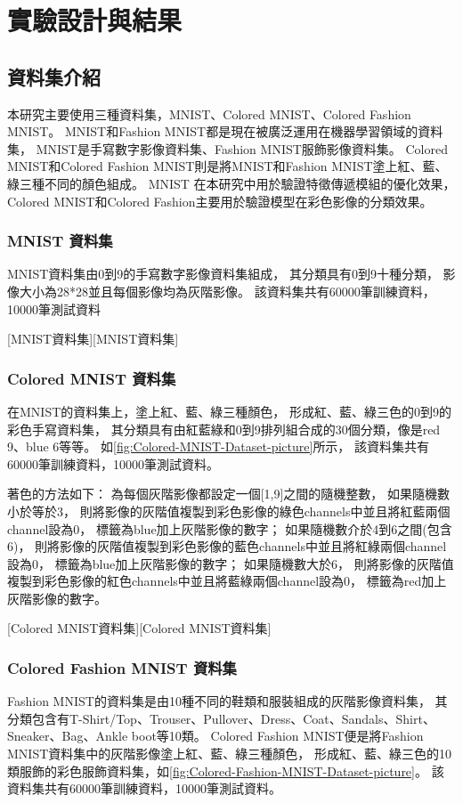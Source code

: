 \documentclass[class=NCU\_thesis, crop=false]{standalone}
\begin{document}
\chapter{實驗設計與結果}
\section{資料集介紹}
本研究主要使用三種資料集，MNIST\cite{726791}、Colored MNIST、Colored Fashion MNIST。
MNIST和Fashion MNIST\cite{xiao2017fashionmnist}都是現在被廣泛運用在機器學習領域的資料集，
MNIST是手寫數字影像資料集、Fashion MNIST服飾影像資料集。 
Colored MNIST和Colored Fashion MNIST則是將MNIST和Fashion MNIST塗上紅、藍、綠三種不同的顏色組成。
MNIST 在本研究中用於驗證特徵傳遞模組的優化效果，
Colored MNIST和Colored Fashion主要用於驗證模型在彩色影像的分類效果。
\pagebreak
    \subsection{MNIST 資料集}
    MNIST資料集由0到9的手寫數字影像資料集組成，
    其分類具有0到9十種分類，
    影像大小為28*28並且每個影像均為灰階影像。
    該資料集共有60000筆訓練資料，10000筆測試資料

    [MNIST資料集][MNIST資料集]
    \pagebreak
    \subsection{Colored MNIST 資料集}
    在MNIST的資料集上，塗上紅、藍、綠三種顏色，
    形成紅、藍、綠三色的0到9的彩色手寫資料集，
    其分類具有由紅藍綠和0到9排列組合成的30個分類，像是red 9、blue 6等等。
    如\cref{fig:Colored-MNIST-Dataset-picture}所示，
    該資料集共有60000筆訓練資料，10000筆測試資料。

    著色的方法如下：
    為每個灰階影像都設定一個[1,9]之間的隨機整數，
    如果隨機數小於等於3，
    則將影像的灰階值複製到彩色影像的綠色channels中並且將紅藍兩個channel設為0，
    標籤為blue加上灰階影像的數字；
    如果隨機數介於4到6之間(包含6)，
    則將影像的灰階值複製到彩色影像的藍色channels中並且將紅綠兩個channel設為0，
    標籤為blue加上灰階影像的數字；
    如果隨機數大於6，
    則將影像的灰階值複製到彩色影像的紅色channels中並且將藍綠兩個channel設為0，
    標籤為red加上灰階影像的數字。

    [Colored MNIST資料集][Colored MNIST資料集]
    \pagebreak
    \subsection{Colored Fashion MNIST 資料集}
    Fashion MNIST的資料集是由10種不同的鞋類和服裝組成的灰階影像資料集，
    其分類包含有T-Shirt/Top、Trouser、Pullover、Dress、Coat、Sandals、Shirt、Sneaker、Bag、Ankle boot等10類。
    Colored Fashion MNIST便是將Fashion MNIST資料集中的灰階影像塗上紅、藍、綠三種顏色，
    形成紅、藍、綠三色的10類服飾的彩色服飾資料集，如\cref{fig:Colored-Fashion-MNIST-Dataset-picture}。
    該資料集共有60000筆訓練資料，10000筆測試資料。
\end{document}
